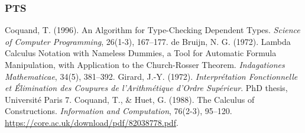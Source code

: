 \documentclass{article}
\theoremstyle{plain}
\theoremstyle{definition}
\begin{document}
\begin{thebibliography}{9}
\subsubsection*{PTS}
 Coquand, T. (1996). An Algorithm for Type-Checking Dependent Types. \emph{Science of Computer Programming}, 26(1-3), 167--177.
 de Bruijn, N. G. (1972). Lambda Calculus Notation with Nameless Dummies, a Tool for Automatic Formula Manipulation, with Application to the Church-Rosser Theorem. \emph{Indagationes Mathematicae}, 34(5), 381--392.
 Girard, J.-Y. (1972). \emph{Interprétation Fonctionnelle et Élimination des Coupures de l’Arithmétique d’Ordre Supérieur}. PhD thesis, Université Paris 7.
 Coquand, T., \& Huet, G. (1988). The Calculus of Constructions. \emph{Information and Computation}, 76(2-3), 95--120. \url{https://core.ac.uk/download/pdf/82038778.pdf}.
\end{thebibliography}
\end{document}
